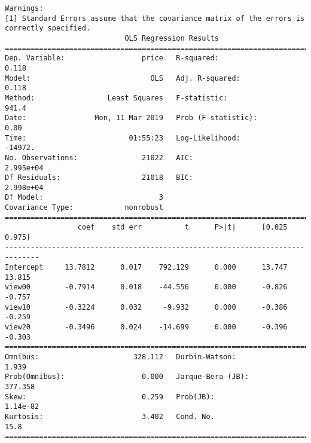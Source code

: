 \documentclass[11pt]{article}
\begin{document}
\begin{Verbatim}[commandchars=\\\{\}]
Warnings:
[1] Standard Errors assume that the covariance matrix of the errors is correctly specified.
                            OLS Regression Results                            
==============================================================================
Dep. Variable:                  price   R-squared:                       0.118
Model:                            OLS   Adj. R-squared:                  0.118
Method:                 Least Squares   F-statistic:                     941.4
Date:                Mon, 11 Mar 2019   Prob (F-statistic):               0.00
Time:                        01:55:23   Log-Likelihood:                -14972.
No. Observations:               21022   AIC:                         2.995e+04
Df Residuals:                   21018   BIC:                         2.998e+04
Df Model:                           3                                         
Covariance Type:            nonrobust                                         
==============================================================================
                 coef    std err          t      P>|t|      [0.025      0.975]
------------------------------------------------------------------------------
Intercept     13.7812      0.017    792.129      0.000      13.747      13.815
view00        -0.7914      0.018    -44.556      0.000      -0.826      -0.757
view10        -0.3224      0.032     -9.932      0.000      -0.386      -0.259
view20        -0.3496      0.024    -14.699      0.000      -0.396      -0.303
==============================================================================
Omnibus:                      328.112   Durbin-Watson:                   1.939
Prob(Omnibus):                  0.000   Jarque-Bera (JB):              377.358
Skew:                           0.259   Prob(JB):                     1.14e-82
Kurtosis:                       3.402   Cond. No.                         15.8
==============================================================================


\end{Verbatim}
\end{document}
